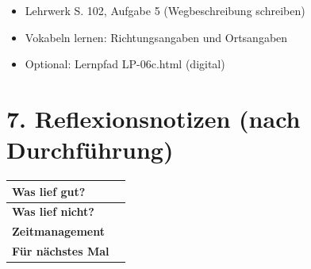 \documentclass[11pt, a4paper]{article}
\newcommand{\sequenz}{06}
\newcommand{\block}{c}
\begin{document}
\begin{itemize}
    \item Lehrwerk S. 102, Aufgabe 5 (Wegbeschreibung schreiben)
    \item Vokabeln lernen: Richtungsangaben und Ortsangaben
    \item Optional: Lernpfad LP-\sequenz\block.html (digital)
\end{itemize}


\section*{7. Reflexionsnotizen (nach Durchführung)}

\begin{tabularx}{\textwidth}{|l|X|}
\hline
\textbf{Was lief gut?} & \\[2em]
\hline
\textbf{Was lief nicht?} & \\[2em]
\hline
\textbf{Zeitmanagement} & \\[2em]
\hline
\textbf{Für nächstes Mal} & \\[2em]
\hline
\end{tabularx}
\end{document}

